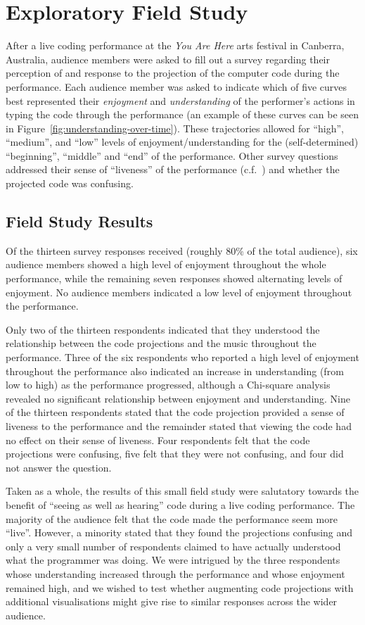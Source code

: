 \documentclass{sig-alternate}
\begin{document}
\section{Exploratory Field Study}

After a live coding performance at the \emph{You Are Here} arts
festival in Canberra, Australia, audience members were asked to fill
out a survey regarding their perception of and response to the
projection of the computer code during the performance. Each audience
member was asked to indicate which of five curves best represented
their \emph{enjoyment} and \emph{understanding} of the performer's
actions in typing the code through the performance (an example of
these curves can be seen in Figure~\ref{fig:understanding-over-time}).
These trajectories allowed for ``high'', ``medium'', and ``low''
levels of enjoyment/understanding for the (self-determined)
``beginning'', ``middle'' and ``end'' of the performance. Other survey
questions addressed their sense of ``liveness'' of the performance
(c.f.~\cite{Auslander}) and whether the projected code was confusing.

\subsection{Field Study Results}

Of the thirteen survey responses received (roughly $80\%$ of the total
audience), six audience members showed a high level of enjoyment
throughout the whole performance, while the remaining seven responses
showed alternating levels of enjoyment. No audience members indicated
a low level of enjoyment throughout the performance.

Only two of the thirteen respondents indicated that they understood
the relationship between the code projections and the music throughout
the performance. Three of the six respondents who reported a high
level of enjoyment throughout the performance also indicated an
increase in understanding (from low to high) as the performance
progressed, although a Chi-square analysis revealed no significant
relationship between enjoyment and understanding. Nine of the thirteen
respondents stated that the code projection provided a sense of
liveness to the performance and the remainder stated that viewing the
code had no effect on their sense of liveness. Four respondents felt
that the code projections were confusing, five felt that they were not
confusing, and four did not answer the question.

Taken as a whole, the results of this small field study were
salutatory towards the benefit of ``seeing as well as hearing'' code
during a live coding performance. The majority of the audience felt
that the code made the performance seem more ``live''. However, a
minority stated that they found the projections confusing and only a
very small number of respondents claimed to have actually understood
what the programmer was doing. We were intrigued by the three
respondents whose understanding increased through the performance and
whose enjoyment remained high, and we wished to test whether
augmenting code projections with additional visualisations might give
rise to similar responses across the wider audience.
\end{document}
